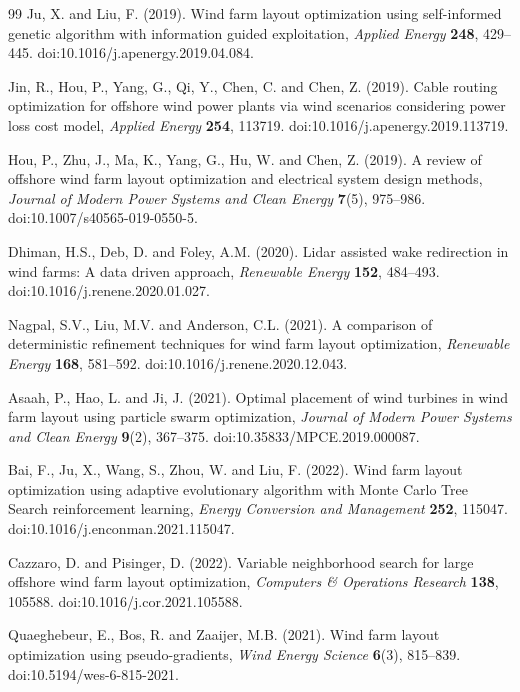 \documentclass[journal,twoside]{IEEEtran}
\begin{document}
\begin{thebibliography}{99}
Ju, X. and Liu, F. (2019). Wind farm layout optimization using self-informed genetic algorithm with information guided exploitation, \textit{Applied Energy} \textbf{248}, 429--445. doi:10.1016/j.apenergy.2019.04.084.

Jin, R., Hou, P., Yang, G., Qi, Y., Chen, C. and Chen, Z. (2019). Cable routing optimization for offshore wind power plants via wind scenarios considering power loss cost model, \textit{Applied Energy} \textbf{254}, 113719. doi:10.1016/j.apenergy.2019.113719.

Hou, P., Zhu, J., Ma, K., Yang, G., Hu, W. and Chen, Z. (2019). A review of offshore wind farm layout optimization and electrical system design methods, \textit{Journal of Modern Power Systems and Clean Energy} \textbf{7}(5), 975--986. doi:10.1007/s40565-019-0550-5.

Dhiman, H.S., Deb, D. and Foley, A.M. (2020). Lidar assisted wake redirection in wind farms: A data driven approach, \textit{Renewable Energy} \textbf{152}, 484--493. doi:10.1016/j.renene.2020.01.027.

Nagpal, S.V., Liu, M.V. and Anderson, C.L. (2021). A comparison of deterministic refinement techniques for wind farm layout optimization, \textit{Renewable Energy} \textbf{168}, 581--592. doi:10.1016/j.renene.2020.12.043.

Asaah, P., Hao, L. and Ji, J. (2021). Optimal placement of wind turbines in wind farm layout using particle swarm optimization, \textit{Journal of Modern Power Systems and Clean Energy} \textbf{9}(2), 367--375. doi:10.35833/MPCE.2019.000087.

Bai, F., Ju, X., Wang, S., Zhou, W. and Liu, F. (2022). Wind farm layout optimization using adaptive evolutionary algorithm with Monte Carlo Tree Search reinforcement learning, \textit{Energy Conversion and Management} \textbf{252}, 115047. doi:10.1016/j.enconman.2021.115047.

Cazzaro, D. and Pisinger, D. (2022). Variable neighborhood search for large offshore wind farm layout optimization, \textit{Computers \& Operations Research} \textbf{138}, 105588. doi:10.1016/j.cor.2021.105588.

Quaeghebeur, E., Bos, R. and Zaaijer, M.B. (2021). Wind farm layout optimization using pseudo-gradients, \textit{Wind Energy Science} \textbf{6}(3), 815--839. doi:10.5194/wes-6-815-2021.


\end{thebibliography}
\end{document}
